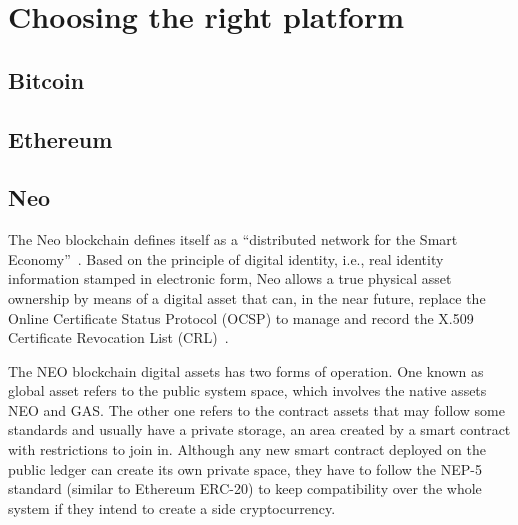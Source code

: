 \section{Choosing the right platform}
\label{sec:platform}

\subsection{Bitcoin}
\label{ssec:bitcoin}
    
    
\subsection{Ethereum}
\label{ssec:ethereum}

\subsection{Neo}
\label{ssec:neo}
The Neo blockchain defines itself as a ``distributed network for the Smart Economy''~\cite{neowp}.
Based on the principle of digital identity, i.e., real identity information stamped in electronic form,
Neo allows a true physical asset ownership by means of a digital asset that can, in the near future, replace the Online Certificate Status Protocol (OCSP) to manage and record the X.509 Certificate Revocation List (CRL)~\cite{neowp}.

The NEO blockchain digital assets has two forms of operation.
One known as global asset refers to the public system space, which involves the native assets NEO and GAS.
The other one refers to the contract assets that may follow some standards and usually have a private storage, an area created by a smart contract with restrictions to join in.
Although any new smart contract deployed on the public ledger can create its own private space, they have to follow  the NEP-5 standard (similar to Ethereum ERC-20) to keep compatibility over the whole system if they intend to create a side cryptocurrency.

